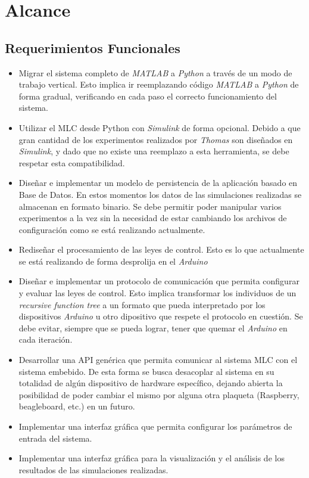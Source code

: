 \documentclass[a4paper,10pt]{article}
\begin{document}
    \newpage
    \section{Alcance}
    \subsection{Requerimientos Funcionales} \label{sec:functional}
        \begin{itemize}
            \item Migrar el sistema completo de \textit{MATLAB} a \textit{Python} a través de un modo de trabajo vertical. Esto implica
            ir reemplazando código \textit{MATLAB} a \textit{Python} de forma gradual, verificando en cada paso el correcto funcionamiento
            del sistema.
            \item Utilizar el MLC desde Python con \textit{Simulink} de forma opcional. Debido a que gran cantidad de los experimentos
            realizados por \textit{Thomas} son diseñados en \textit{Simulink}, y dado que no existe una reemplazo a esta herramienta, se
            debe respetar esta compatibilidad.
            \item Diseñar e implementar un modelo de persistencia de la aplicación basado en Base de Datos. En estos momentos los datos
            de las simulaciones realizadas se almacenan en formato binario. Se debe permitir poder manipular varios experimentos a la vez
            sin la necesidad de estar cambiando los archivos de configuración como se está realizando actualmente.
            \item Rediseñar el procesamiento de las leyes de control. Esto es lo que actualmente se está realizando de forma desprolija
            en el \textit{Arduino}
            \item Diseñar e implementar un protocolo de comunicación que permita configurar y evaluar las leyes de control. Esto implica
            transformar los individuos de un \textit{recursive function tree} a un formato que pueda interpretado por los dispositivos
            \textit{Arduino} u otro dipositivo que respete el protocolo en cuestión. Se debe evitar, siempre que se pueda lograr, tener
            que quemar el \textit{Arduino} en cada iteración. 
            \item Desarrollar una API genérica que permita comunicar al sistema MLC con el sistema embebido. De esta forma se busca
            desacoplar al sistema en su totalidad de algún dispositivo de hardware específico, dejando abierta la posibilidad de poder
            cambiar el mismo por alguna otra plaqueta (Raspberry, beagleboard, etc.) en un futuro.
            \item Implementar una interfaz gráfica que permita configurar los parámetros de entrada del sistema.
            \item Implementar una interfaz gráfica para la visualización y el análisis de los resultados de las simulaciones realizadas.
        \end{itemize}
\end{document}
